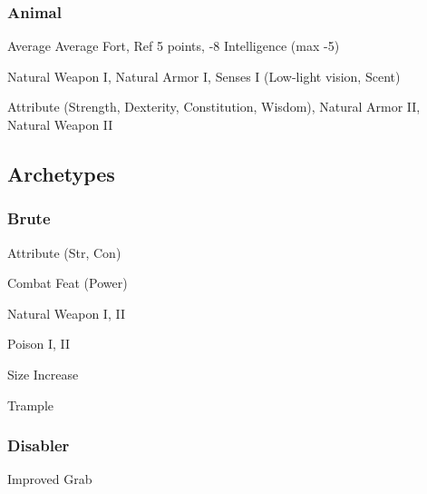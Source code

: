 \subsubsection{Animal}
\tbab Average
\tsaves Average Fort, Ref
 5 points, -8 Intelligence (max -5)

 Natural Weapon I, Natural Armor I, Senses I (Low-light vision, Scent)

 Attribute (Strength, Dexterity, Constitution, Wisdom), Natural Armor II, Natural Weapon II

\subsection{Archetypes}

\subsubsection{Brute}
\begin{itemize*}
    \item Attribute (Str, Con)
    \item Combat Feat (Power)
    \item Natural Weapon I, II
    \item Poison I, II
    \item Size Increase
    \item Trample
\end{itemize*}

\subsubsection{Disabler}
\begin{itemize*}
    \item Improved Grab
\end{itemize*}
